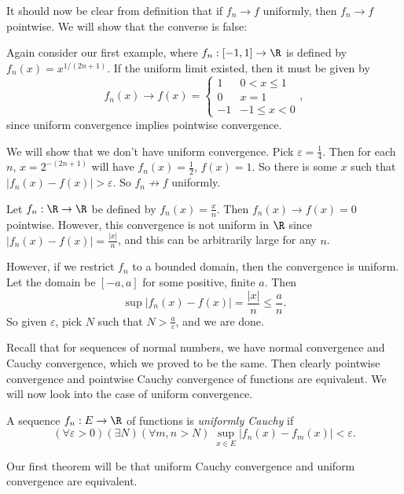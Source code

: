 \documentclass[a4paper]{article}
\begin{document}
It should now be clear from definition that if $f_n \to f$ uniformly, then $f_n \to f$ pointwise. We will show that the converse is false:
\begin{eg}
  Again consider our first example, where $f_n: [-1, 1] \to \R$ is defined by $f_n(x) = x^{1/(2n + 1)}$. If the uniform limit existed, then it must be given by
  \[
    f_n(x) \to f(x) =
    \begin{cases}
      1 & 0 < x \leq 1\\
      0 & x = 1\\
      -1 & -1 \leq x < 0
    \end{cases},
  \]
  since uniform convergence implies pointwise convergence.

  We will show that we don't have uniform convergence. Pick $\varepsilon = \frac{1}{4}$. Then for each $n$, $x = 2^{-(2n + 1)}$ will have $f_n(x) = \frac{1}{2}$, $f(x) = 1$. So there is some $x$ such that $|f_n(x) - f(x)| > \varepsilon$. So $f_n \not\to f$ uniformly.
\end{eg}

\begin{eg}
  Let $f_n: \R \to \R$ be defined by $f_n (x) = \frac{x}{n}$. Then $f_n(x) \to f(x) = 0$ pointwise. However, this convergence is not uniform in $\R$ since $|f_n(x) - f(x)| = \frac{|x|}{n}$, and this can be arbitrarily large for any $n$.

  However, if we restrict $f_n$ to a bounded domain, then the convergence is uniform. Let the domain be $[-a, a]$ for some positive, finite $a$. Then
  \[
    \sup |f_n(x) - f(x)| = \frac{|x|}{n} \leq \frac{a}{n}.
  \]
  So given $\varepsilon$, pick $N$ such that $N > \frac{a}{\varepsilon}$, and we are done.
\end{eg}

Recall that for sequences of normal numbers, we have normal convergence and Cauchy convergence, which we proved to be the same. Then clearly pointwise convergence and pointwise Cauchy convergence of functions are equivalent. We will now look into the case of uniform convergence.

\begin{defi}
  A sequence $f_n: E\to \R$ of functions is \emph{uniformly Cauchy} if
  \[
    (\forall \varepsilon > 0)(\exists N)(\forall m,n > N)\;\sup_{x\in E}|f_n(x) - f_m(x)| < \varepsilon.
  \]
\end{defi}

Our first theorem will be that uniform Cauchy convergence and uniform convergence are equivalent.
\end{document}
